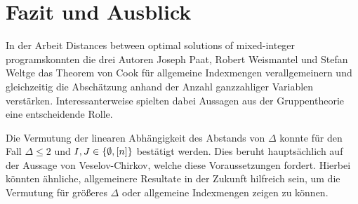 \section{Fazit und Ausblick}

In der Arbeit \glqq Distances between optimal solutions of mixed-integer programs\grqq konnten die drei Autoren Joseph Paat,
Robert Weismantel und Stefan Weltge das Theorem von Cook für allgemeine Indexmengen verallgemeinern und gleichzeitig die Abschätzung anhand der Anzahl ganzzahliger Variablen verstärken.
Interessanterweise spielten dabei Aussagen aus der Gruppentheorie eine entscheidende Rolle.

Die Vermutung der linearen Abhängigkeit des Abstands von $\Delta$ konnte für den Fall $\Delta\leq 2$ und $I,J\in\{\emptyset,[n]\}$ bestätigt werden.
Dies beruht hauptsächlich auf der Aussage von Veselov-Chirkov, welche diese Voraussetzungen fordert.
Hierbei könnten ähnliche, allgemeinere Resultate in der Zukunft hilfreich sein, um die Vermutung für größeres $\Delta$ oder allgemeine Indexmengen zeigen zu können.
